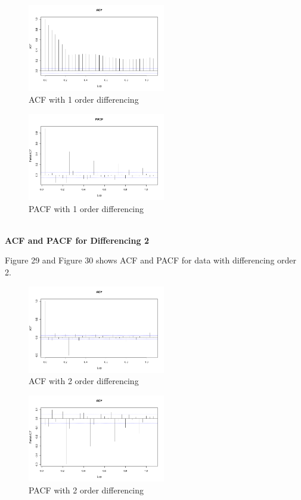 \documentclass{article}
\begin{document}
\begin{figure}[ht]
	\centering
	\includegraphics[width=6cm]{ACFWith1Differencing.png}
	\caption{ACF with 1 order differencing}
	\label{fig: ACF with 1 order differencing}
\end{figure}
\newpage
\begin{figure}[ht]
	\centering
	\includegraphics[width=6cm]{PACFWith1Differencing.png}
	\caption{PACF with 1 order differencing}
	\label{fig: PACF with 1 order differencing}
\end{figure}

\\ \textbf{ACF and PACF for Differencing 2}

Figure 29 and Figure 30 shows ACF and PACF for data with differencing order 2.

\begin{figure}[ht]
	\centering
	\includegraphics[width=6cm]{ACFWith2Differencing.png}
	\caption{ACF with 2 order differencing}
	\label{fig: ACF with 2 order differencing}
\end{figure}

\begin{figure}[ht]
	\centering
	\includegraphics[width=6cm]{PACFWith2Differencing.png}
	\caption{PACF with 2 order differencing}
	\label{fig: PACF with 2 order differencing}
\end{figure}
\end{document}
